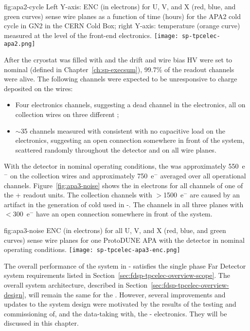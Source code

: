 \begin{dunefigure}
{fig:apa2-cycle}
{Left Y-axis: ENC (in electrons) for U, V, and X (red, blue, and green curves) sense wire planes as a function of time (hours) for the APA2 cold cycle in GN2 in the CERN Cold Box; right Y-axis: temperature (orange curve) measured at the level of the front-end electronics.}
\texttt{[image: sp-tpcelec-apa2.png]}
\end{dunefigure}

After the cryostat was filled with  and the drift and wire bias HV were set to nominal (defined in Chapter~\ref{ch:sp-execsum}), 99.7\% of the  readout channels were alive. The following channels were expected to be unresponsive to charge deposited on the wires:
\begin{itemize}
\item Four electronics channels, suggesting a dead channel in the electronics, all on collection wires on three different ;
\item $\sim$35 channels measured with  consistent with no capacitive load on the  electronics, suggesting an open connection somewhere in front of the  system, scattered randomly throughout the detector and on all wire planes.
\end{itemize}
With the detector in nominal operating conditions, the  was approximately 550~e$^-$ on the collection wires and approximately 750~e$^-$ averaged over all operational channels. Figure~\ref{fig:apa3-noise} shows the  in electrons for all channels of one of the + readout units. The collection channels with $>$1500~e$^-$ are caused by an artifact in the generation of cold   used in -. The channels in all three planes with $<$300~e$^-$ have an open connection somewhere in front of the  system.

\begin{dunefigure}
{fig:apa3-noise}
{ENC (in electrons) for all U, V, and X (red, blue, and green curves) sense wire planes for one ProtoDUNE APA with the detector in nominal operating conditions.}
\texttt{[image: sp-tpcelec-apa3-enc.png]}
\end{dunefigure}

The overall performance of the  system in - satisfies the  single phase Far Detector  system requirements listed in Section~\ref{sec:fdsp-tpcelec-overview-scope}. The overall system architecture, described in Section~\ref{sec:fdsp-tpcelec-overview-design}, will remain the same for the  . However, several improvements and updates to the  system design were motivated by the results of the testing and commissioning of, and the data-taking with, the - electronics. They will be discussed in this chapter.


